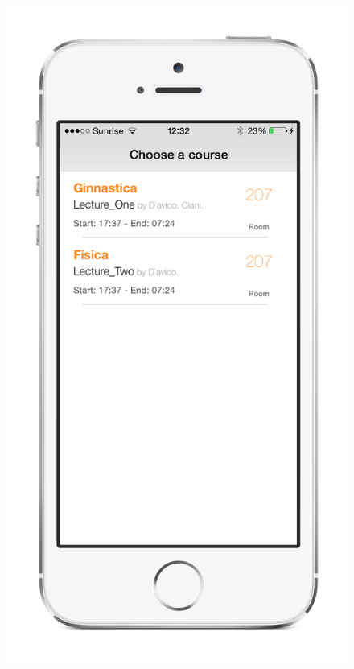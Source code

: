 \begin{figure}[htbp]
\begin{center}
\includegraphics[scale=0.5]{img/iphone_courses.png}

\end{center}
\end{figure}
